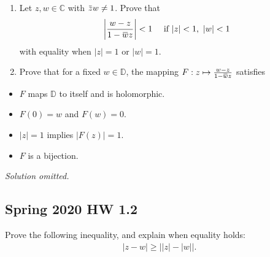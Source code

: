 \begin{problem}[?]

\begin{enumerate}
\def\labelenumi{\alph{enumi}.}
\item
  Let \(z, w \in {\mathbb{C}}\) with
  \(\mkern 1.5mu\overline{\mkern-1.5muz\mkern-1.5mu}\mkern 1.5mu w \neq 1\).
  Prove that
  \begin{align*}
  {\left\lvert {w-z \over 1 - \mkern 1.5mu\overline{\mkern-1.5muw\mkern-1.5mu}\mkern 1.5mu z} \right\rvert} < 1 \quad\text{ if } {\left\lvert {z} \right\rvert}<1,~ {\left\lvert {w} \right\rvert} < 1
  \end{align*}
  with equality when \({\left\lvert {z} \right\rvert} = 1\) or
  \({\left\lvert {w} \right\rvert} = 1\).
\item
  Prove that for a fixed \(w\in {\mathbb{D}}\), the mapping
  \(F: z\mapsto {w-z \over 1 - \mkern 1.5mu\overline{\mkern-1.5muw\mkern-1.5mu}\mkern 1.5mu z}\)
  satisfies
\end{enumerate}

\begin{itemize}
\tightlist
\item
  \(F\) maps \({\mathbb{D}}\) to itself and is holomorphic.
\item
  \(F(0) = w\) and \(F(w) = 0\).
\item
  \({\left\lvert {z} \right\rvert} = 1\) implies
  \({\left\lvert {F(z)} \right\rvert} = 1\).
\item
  \(F\) is a bijection.
\end{itemize}

\end{problem}

\emph{Solution omitted.}

\hypertarget{spring-2020-hw-1.2}{%
\subsection{Spring 2020 HW 1.2}\label{spring-2020-hw-1.2}}

\begin{problem}[?]

Prove the following inequality, and explain when equality holds:
\begin{align*}
{\left\lvert {z-w} \right\rvert} \geq {\left\lvert { {\left\lvert {z} \right\rvert} - {\left\lvert {w} \right\rvert} } \right\rvert}
.\end{align*}

\end{problem}

